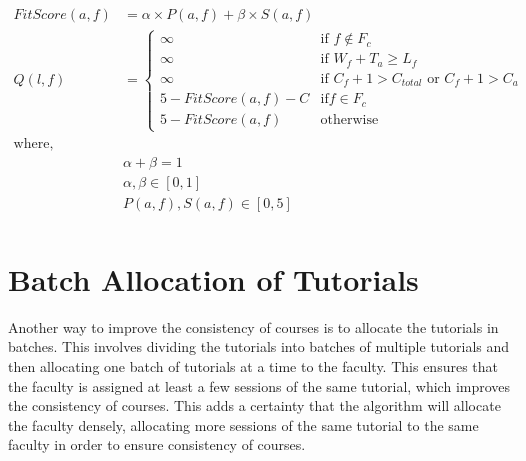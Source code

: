 \begin{equation}
  \label{eq:cost_function_workload}
  \begin{aligned}
    FitScore(a, f) & = \alpha \times P(a, f) + \beta \times S(a, f)                                      \\
    Q(l, f)        & = \begin{cases}
                         \infty                 & \text{if } f \notin F_c                                  \\
                         \infty                 & \text{if } W_f + T_a \ge L_f                             \\
                         \infty                 & \text{if } C_f + 1 > C_{total} \text{ or } C_f + 1 > C_a \\
                         5 - FitScore(a, f) - C & \text{if} f \in F_c                                      \\
                         5 - FitScore(a, f)     & \text{otherwise}
                       \end{cases} \\
    \text{where, } &                                                                                     \\
                   & \alpha + \beta = 1                                                                  \\
                   & \alpha, \beta \in [0, 1]                                                            \\
                   & P(a, f), S(a, f) \in [0, 5]                                                         \\
  \end{aligned}
\end{equation}


\section{Batch Allocation of Tutorials}

Another way to improve the consistency of courses is to allocate the tutorials in batches. This involves dividing the tutorials into batches of multiple tutorials and then allocating one batch of tutorials at a time to the faculty. This ensures that the faculty is assigned at least a few sessions of the same tutorial, which improves the consistency of courses. This adds a certainty that the algorithm will allocate the faculty densely, allocating more sessions of the same tutorial to the same faculty in order to ensure consistency of courses.

